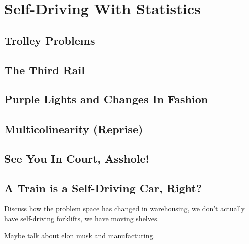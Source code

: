 \setchapterpreamble[u]{\margintoc}
\chapter{Self-Driving With Statistics}


\section{Trolley Problems}

\section{The Third Rail}

\section{Purple Lights and Changes In Fashion}

\section{Multicolinearity (Reprise)}

\section{See You In Court, Asshole!}

\section{A Train is a Self-Driving Car, Right?}

Discuss how the problem space has changed in warehousing, we don't actually have self-driving forklifts, we have moving shelves.

Maybe talk about elon musk and manufacturing.
